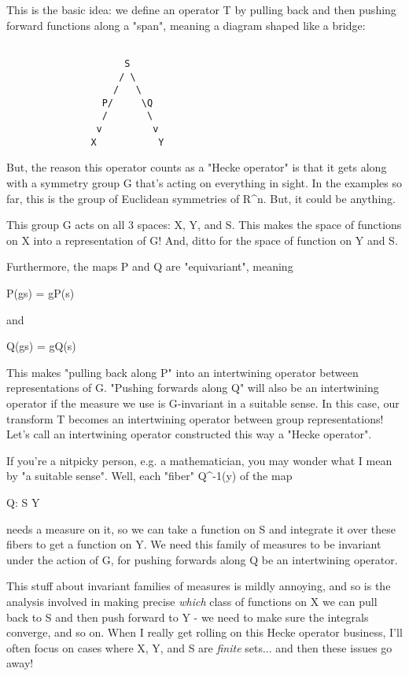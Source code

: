 This is the basic idea: we define an operator T by pulling
back and then pushing forward functions along a "span", meaning
a diagram shaped like a bridge:


\begin{verbatim}

                     S
                    / \
                   /   \
                 P/     \Q
                 /       \
                v         v 
               X           Y
\end{verbatim}
    
But, the reason this operator counts as a "Hecke operator" 
is that it gets along with a symmetry group G that's acting 
on everything in sight.  In the examples so far, this is 
the group of Euclidean symmetries of R^{n}.  But, it could be
anything.  

This group G acts on all 3 spaces: X, Y, and S.  This makes the 
space of functions on X into a representation of G!  And, ditto 
for the space of function on Y and S.

Furthermore, the maps P and Q are "equivariant", meaning

P(gs) = gP(s)

and

Q(gs) = gQ(s)

This makes "pulling back along P" into an intertwining operator
between representations of G.  "Pushing forwards along Q" will
also be an intertwining operator if the measure we use is 
G-invariant in a suitable sense.  In this case, our transform T 
becomes an intertwining operator between group representations!  
Let's call an intertwining operator constructed this way a "Hecke 
operator".

If you're a nitpicky person, e.g. a mathematician, you may wonder what
I mean by "a suitable sense".  Well, each "fiber"
Q^{-1}(y) of the map

Q: S \to  Y

needs a measure on it, so we can take a function on S and 
integrate it over these fibers to get a function on Y.   We need 
this family of measures to be invariant under the action of G, 
for pushing forwards along Q be an intertwining operator.

This stuff about invariant families of measures is mildly 
annoying, and so is the analysis involved in making precise 
\emph{which} class of functions on X we can pull back to S and then 
push forward to Y - we need to make sure the integrals converge, 
and so on.  When I really get rolling on this Hecke operator 
business, I'll often focus on cases where X, Y, and S are 
\emph{finite} sets... and then these issues go away!

